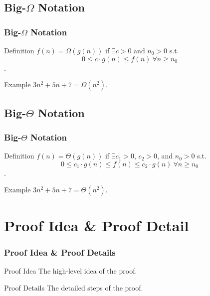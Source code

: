\documentclass[t]{beamer}
\begin{document}
        \subsection{Big-$\Omega$ Notation}
            \begin{frame}
                \frametitle{Big-$\Omega$ Notation}
                \begin{block}{Definition}
                    $f(n) = \Omega(g(n))$ if $\exists c > 0$ and $n_0 > 0$ s.t. \[0 \leq c \cdot g(n) \leq f(n)\ \forall n \geq n_0\].
                \end{block}

                \begin{block}{Example}
                    $3n^2 + 5n + 7 = \Omega(n^2)$.
                \end{block}
            \end{frame}

        \subsection{Big-$\Theta$ Notation}
            \begin{frame}
                \frametitle{Big-$\Theta$ Notation}
                \begin{block}{Definition}
                    $f(n) = \Theta(g(n))$ if $\exists c_1 > 0$, $c_2 > 0$, and $n_0 > 0$ s.t. 
                    \[0 \leq c_1 \cdot g(n) \leq f(n) \leq c_2 \cdot g(n)\ \forall n \geq n_0\].
                \end{block}

                \begin{block}{Example}
                    $3n^2 + 5n + 7 = \Theta(n^2)$.
                \end{block}
            \end{frame}


    \section{Proof Idea \& Proof Detail}


        \begin{frame}
            \frametitle{Proof Idea \& Proof Details}
            \begin{block}{Proof Idea}
                The high-level idea of the proof.
            \end{block}

            \begin{block}{Proof Details}
                The detailed steps of the proof.
            \end{block}
        \end{frame}
\end{document}
